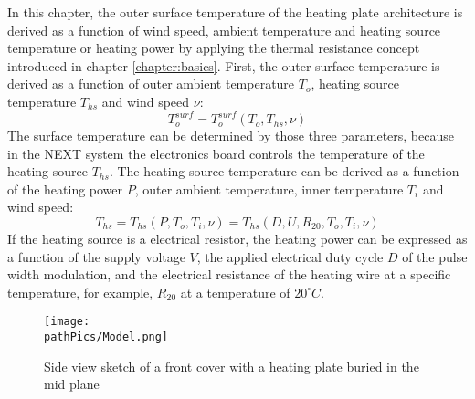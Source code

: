 In this chapter, the outer surface temperature of the heating plate architecture is derived as a function of wind speed, ambient temperature and heating source temperature or heating power by applying the thermal resistance concept introduced in chapter \ref{chapter:basics}. First, the outer surface temperature is derived as a function of outer ambient temperature \(T_o\), heating source temperature \(T_{hs}\) and wind speed \(\nu\):
\begin{equation}
T_o^{surf} = T_o^{surf}(T_o,T_{hs},\nu)
\end{equation}
The surface temperature can be determined by those three parameters, because in the NEXT system the electronics board controls the temperature of the heating source \(T_{hs}\). The heating source temperature can be derived as a function of the heating power \(P\), outer ambient temperature, inner temperature \(T_i\) and wind speed: 
\begin{equation}
T_{hs} = T_{hs}(P,T_o,T_i,\nu) = T_{hs}(D,U,R_{20}, T_o,T_i,\nu)
\end{equation}
If the heating source is a electrical resistor, the heating power can be expressed as a function of the supply voltage \(V\), the applied electrical duty cycle \(D\) of the pulse width modulation, and the electrical resistance of the heating wire at a specific temperature, for example, \(R_{20}\) at a temperature of \(20^{\circ}C\).  
\begin{figure} [H]
	\centering
	\texttt{[image: \\pathPics/Model.png]}
	\caption[Front Cover Heat Transfer Model]{Side view sketch of a front cover with a heating plate buried in the mid plane}
	\label{fig:platemodel}
\end{figure}

